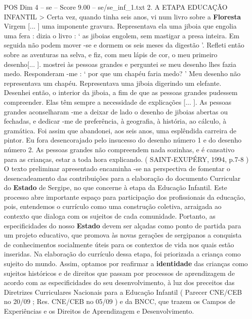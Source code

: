 \begin{textsample}{POS Dim 4 – se – Score 9.00 – se/se\_inf\_1.txt}  \label{ex:f4_pos_143}
2.
A ETAPA EDUCAÇÃO INFANTIL > Certa vez, quando tinha seis anos, vi num livro sobre a \textbf{Floresta} Virgem [... ] uma imponente gravura.
Representava ela uma jiboia que engolia uma fera : dizia o livro : ‘ as jiboias engolem, sem mastigar a presa inteira.
Em seguida não podem mover -se e dormem os seis meses da digestão ’.
Refleti então sobre as aventuras na selva, e fiz, com meu lápis de cor, o meu primeiro desenho[... ]. mostrei às pessoas grandes e perguntei se meu desenho lhes fazia medo.
Responderam -me : ‘ por que um chapéu faria medo? ’ Meu desenho não representava um chapéu.
Representava uma jiboia digerindo um elefante.
Desenhei então, o interior da jiboia, a fim de que as pessoas grandes pudessem compreender.
Elas têm sempre a necessidade de explicações [... ].
As pessoas grandes aconselharam -me a deixar de lado o desenho de jiboias abertas ou fechadas, e dedicar -me de preferência, à geografia, à história, ao cálculo, à gramática.
Foi assim que abandonei, aos seis anos, uma esplêndida carreira de pintor.
Eu fora desencorajado pelo insucesso do desenho número 1 e do desenho número 2.
As pessoas grandes não compreendem nada sozinhas, e é cansativo para as crianças, estar a toda hora explicando. ( SAINT-EXUPÉRY, 1994, p.7-8 ) O texto preliminar apresentado encaminha -se na perspectiva de fomentar o desencadeamento das contribuições para a elaboração do documento Curricular do \textbf{Estado} de Sergipe, no que concerne à etapa da Educação Infantil.
Este processo abre importante espaço para participação dos profissionais da educação, pois, entendemos o currículo como uma construção coletiva, arraigada ao contexto que dialoga com os sujeitos de cada comunidade.
Portanto, as especificidades do nosso \textbf{Estado} devem ser alçadas como ponto de partida para um projeto educativo, que promova às novas gerações de sergipanos a conquista de conhecimentos socialmente úteis para os contextos de vida nos quais estão inseridas.
Na elaboração do currículo dessa etapa, foi priorizada a criança como sujeito do mundo.
Assim, optamos por reafirmar a \textbf{identidade} das crianças como sujeitos históricos e de direitos que passam por processos de aprendizagem de acordo com as especificidades do seu desenvolvimento, à luz dos preceitos das Diretrizes Curriculares Nacionais para a Educação Infantil ( Parecer CNE/CEB no 20/09 ; Res.
CNE/CEB no 05/09 ) e da BNCC, que trazem os Campos de Experiências e os Direitos de Aprendizagem e Desenvolvimento.

\end{textsample}
